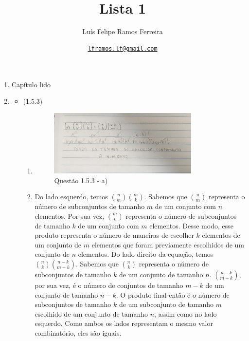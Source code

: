 \documentclass{article}
\title{Lista 1}
\author{Luís Felipe Ramos Ferreira}
\date{\href{mailto:lframos.lf@gmail.com}{\texttt{lframos.lf@gmail.com}}
}
\begin{document}
\maketitle

\begin{enumerate}

	\item Capítulo lido
	\item
	      \begin{itemize}
		      \item (1.5.3)
		            \begin{enumerate}
			            \item
			                  \begin{figure}[H]
				                  \centering
				                  \includegraphics[width=0.8\textwidth]{images/153b.jpg}
				                  \caption{Questão 1.5.3 - a)}
			                  \end{figure}
			            \item
			                  Do lado esquerdo, temos \(\binom{n}{m} \binom{m}{k}\). Sabemos que \(\binom{n}{m}\) representa o número de subconjuntos de tamanho \(m\) de um conjunto com
			                  \(n\) elementos. Por sua vez, \(\binom{m}{k}\) representa o número de subconjuntos de tamanho \(k\) de um conjunto com \(m\) elementos. Desse modo, esse produto representa o número de maneiras de escolher \(k\) elementos de um conjunto de \(m\) elementos que foram previamente escolhidos de um conjunto de \(n\) elementos.
			                  Do lado direito da equação, temos \(\binom{n}{k} \binom{n - k}{m - k}\). Sabemos que \(\binom{n}{k}\) representa o número de subconjuntos de tamanho \(k\) de um conjunto de tamanho \(n\). \(\binom{n-k}{m-k}\), por sua vez, é o número de conjuntos de tamanho \(m-k\) de um conjunto de tamanho \(n-k\). O produto final então é o número de subconjuntos de tamanho \(k\) de um subconjunto de tamanho \(m\) escolhido de um conjunto de tamanho \(n\), assim como no lado esquerdo. Como ambos os lados representam o mesmo valor combinatório, eles são iguais.

\end{enumerate}
\end{itemize}
\end{enumerate}
\end{document}
